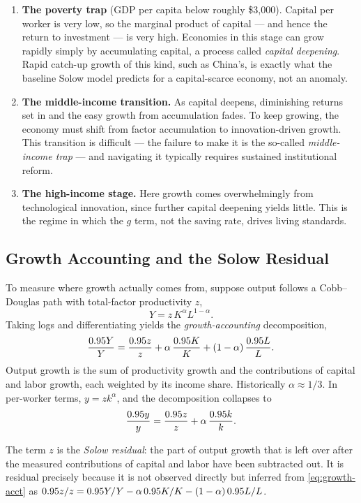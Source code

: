 \begin{enumerate}
    \item \textbf{The poverty trap} (GDP per capita below roughly \$3{,}000). Capital per worker is very low, so the marginal product of capital --- and hence the return to investment --- is very high. Economies in this stage can grow rapidly simply by accumulating capital, a process called \emph{capital deepening}. Rapid catch-up growth of this kind, such as China's, is exactly what the baseline Solow model predicts for a capital-scarce economy, not an anomaly.
    \item \textbf{The middle-income transition.} As capital deepens, diminishing returns set in and the easy growth from accumulation fades. To keep growing, the economy must shift from factor accumulation to innovation-driven growth. This transition is difficult --- the failure to make it is the so-called \emph{middle-income trap} --- and navigating it typically requires sustained institutional reform.
    \item \textbf{The high-income stage.} Here growth comes overwhelmingly from technological innovation, since further capital deepening yields little. This is the regime in which the $g$ term, not the saving rate, drives living standards.
\end{enumerate}

\subsection{Growth Accounting and the Solow Residual}

To measure where growth actually comes from, suppose output follows a Cobb--Douglas path with total-factor productivity $z$,
\[
Y = z\, K^{\alpha} L^{1-\alpha}.
\]
Taking logs and differentiating yields the \emph{growth-accounting} decomposition,
\begin{equation}
\frac{0.95 Y}{Y} = \frac{0.95 z}{z} + \alpha\,\frac{0.95 K}{K} + (1-\alpha)\,\frac{0.95 L}{L}.
\label{eq:growth-acct}
\end{equation}
Output growth is the sum of productivity growth and the contributions of capital and labor growth, each weighted by its income share. Historically $\alpha \approx 1/3$. In per-worker terms, $y = z k^{\alpha}$, and the decomposition collapses to
\[
\frac{0.95 y}{y} = \frac{0.95 z}{z} + \alpha\,\frac{0.95 k}{k}.
\]

The term $z$ is the \emph{Solow residual}: the part of output growth that is left over after the measured contributions of capital and labor have been subtracted out. It is residual precisely because it is not observed directly but inferred from \eqref{eq:growth-acct} as $0.95 z / z = 0.95 Y/Y - \alpha\, 0.95 K/K - (1-\alpha)\, 0.95 L/L$.

